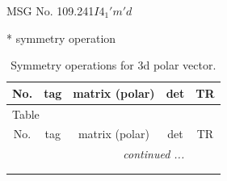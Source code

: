\documentclass[fleqn,8pt]{jsarticle}
\begin{document}
\setcounter{MaxMatrixCols}{32}

\renewcommand{\tablename}{Table~}
\renewcommand{\figurename}{Figure~}
\begin{center}
\LARGE
MSG No. 109.241\quad$I4_{1}'m'd$
\end{center}
* symmetry operation
\renewcommand{\arraystretch}{1.3}
\begin{longtable}{ccccc}
\caption{Symmetry operations for 3d polar vector.}
 \\
 \hline \hline
No. & tag & matrix (polar) & det & TR \\ \hline \endfirsthead

\multicolumn{4}{l}{\tablename\ \thetable{}} \\
 \hline \hline
No. & tag & matrix (polar) & det & TR \\ \hline \endhead

 \hline \hline
\multicolumn{4}{r}{\footnotesize\it continued ...} \\ \endfoot

 \hline \hline
\multicolumn{4}{r}{} \\ \endlastfoot


\end{longtable}
\end{document}
